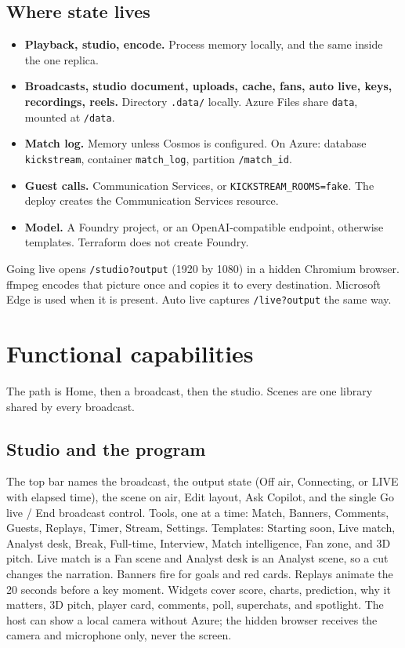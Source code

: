 \documentclass[11pt]{article}
\begin{document}
\subsection{Where state lives}

\begin{itemize}
  \item \textbf{Playback, studio, encode.} Process memory locally, and the same inside the one replica.
  \item \textbf{Broadcasts, studio document, uploads, cache, fans, auto live, keys, recordings, reels.} Directory \texttt{.data/} locally. Azure Files share \texttt{data}, mounted at \texttt{/data}.
  \item \textbf{Match log.} Memory unless Cosmos is configured. On Azure: database \texttt{kickstream}, container \texttt{match\_log}, partition \texttt{/match\_id}.
  \item \textbf{Guest calls.} Communication Services, or \texttt{KICKSTREAM\_ROOMS=fake}. The deploy creates the Communication Services resource.
  \item \textbf{Model.} A Foundry project, or an OpenAI-compatible endpoint, otherwise templates. Terraform does not create Foundry.
\end{itemize}

Going live opens \texttt{/studio?output} (1920 by 1080) in a hidden Chromium browser.
ffmpeg encodes that picture once and copies it to every destination.
Microsoft Edge is used when it is present.
Auto live captures \texttt{/live?output} the same way.

\section{Functional capabilities}

The path is Home, then a broadcast, then the studio.
Scenes are one library shared by every broadcast.

\subsection{Studio and the program}

The top bar names the broadcast, the output state (Off air, Connecting, or LIVE
with elapsed time), the scene on air, Edit layout, Ask Copilot, and the single
Go live / End broadcast control.
Tools, one at a time: Match, Banners, Comments, Guests, Replays, Timer, Stream, Settings.
Templates: Starting soon, Live match, Analyst desk, Break, Full-time, Interview,
Match intelligence, Fan zone, and 3D pitch.
Live match is a Fan scene and Analyst desk is an Analyst scene, so a cut changes
the narration.
Banners fire for goals and red cards.
Replays animate the 20 seconds before a key moment.
Widgets cover score, charts, prediction, why it matters, 3D pitch, player card,
comments, poll, superchats, and spotlight.
The host can show a local camera without Azure; the hidden browser receives the
camera and microphone only, never the screen.
\end{document}
